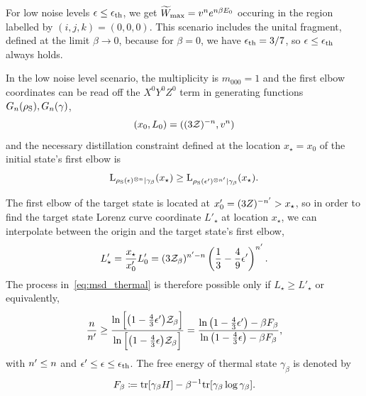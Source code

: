 \documentclass[pra,
aps,
twocolumn,
superscriptaddress,
groupedaddress,
nofootinbib,
reprint
]{revtex4-1}
\begin{document}
For low noise levels $\epsilon \leq \epsilon_{\rm{th}}$, we get $\widetilde{W}_{\rm{max}} = \wn^n e^{n\beta E_0}$ occuring in the region labelled by $(i,j,k) = (0,0,0)$.
This scenario includes the unital fragment, defined at the limit $\beta \rightarrow 0$, because for $\beta = 0$, we have $\epsilon_{\rm{th}} = 3/7$, so $\epsilon \leq \epsilon_{\rm{th}}$ always holds.

In the low noise level scenario, the multiplicity is $m_{000} = 1$ and the first elbow coordinates can be read off the $X^0Y^0Z^0$ term in generating functions $G_n(\noisys), G_n(\gamma)$,
\begin{equation}
	(x_0, L_0) = ((3\Z)^{-n}, \wn^n)
\end{equation}
and the necessary distillation constraint defined at the location $x_\star = x_0$ of the initial state's first elbow is
\begin{equation}\label{eq:first_elbow_constraint}
	\lc{\noisys(\epsilon)\too{n}}{\gamma_\beta}(x_\star) \geq \lc{\noisys(\epsilon')\too{\tt}}{\gamma_\beta}(x_\star).
\end{equation}

The first elbow of the target state is located at $x'_0 = (3Z)^{-\tt} > x_\star$, so in order to find the target state Lorenz curve coordinate $L'_\star$ at location $x_\star$, we can interpolate between the origin and the target state's first elbow, 
\begin{equation}\label{eq:constraint_deriv_temp}
	L'_\star = \frac{x_\star}{x'_0}L'_0 = (3\Z_\beta)^{\tt-n} \left( \frac{1}{3} - \frac{4}{9} \epsilon' \right)^{\tt}.
\end{equation}
The process in~\cref{eq:msd_thermal} is therefore possible only if $L_\star \geq L'_\star$ or equivalently,
\begin{align}
	\frac{n}{n'} \geq \frac{\ln{\Big[ \big( 1-\frac{4}{3}\epsilon' \big)\Z_\beta \Big]}}{\ln{\Big[ \big( 1-\frac{4}{3}\epsilon \big)\Z_\beta \Big]}} = \frac{\ln{\big( 1-\frac{4}{3}\epsilon' \big)} - \beta F_\beta}{\ln{\big( 1-\frac{4}{3}\epsilon \big)} - \beta F_\beta},
\end{align}
with $\tt \leq n$ and $\epsilon' \leq \epsilon \leq \epsilon_{\rm{th}}$. 
The free energy of thermal state $\gamma_\beta$ is denoted by
\begin{equation}
	F_\beta \coloneqq \tr[\gamma_\beta H] - \beta^{-1} \tr[\gamma_\beta \log{\gamma_\beta}].
\end{equation}
\end{document}
